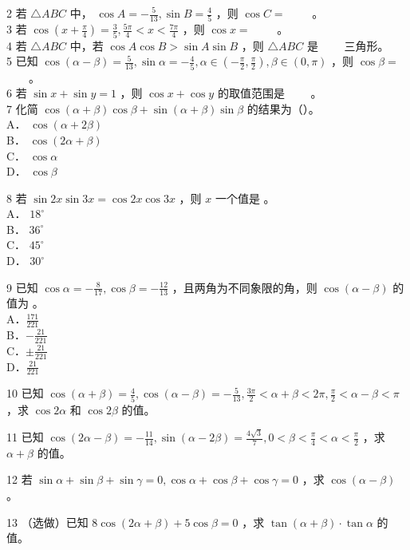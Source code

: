 \documentclass[10pt]{article}
\begin{document}
2 若 \(\triangle A B C\) 中， \(\cos A=-\frac{5}{13}, \sin B=\frac{4}{5}\) ，则 \(\cos C=\) \(\qquad\)。\\
3 若 \(\cos \left(x+\frac{\pi}{4}\right)=\frac{3}{5}, \frac{5 \pi}{4}<x<\frac{7 \pi}{4}\) ，则 \(\cos x=\) \(\qquad\)。\\
4 若 \(\triangle A B C\) 中，若 \(\cos A \cos B>\sin A \sin B\) ，则 \(\triangle A B C\) 是 \(\qquad\)三角形。\\
5 已知 \(\cos (\alpha-\beta)=\frac{5}{13}, \sin \alpha=-\frac{4}{5}, \alpha \in\left(-\frac{\pi}{2}, \frac{\pi}{2}\right), \beta \in(0, \pi)\) ，则 \(\cos \beta=\) \(\qquad\)。\\
6 若 \(\sin x+\sin y=1\) ，则 \(\cos x+\cos y\) 的取值范围是 \(\qquad\)。\\
7 化简 \(\cos (\alpha+\beta) \cos \beta+\sin (\alpha+\beta) \sin \beta\) 的结果为（）。\\
A． \(\cos (\alpha+2 \beta)\)\\
B． \(\cos (2 \alpha+\beta)\)\\
C． \(\cos \alpha\)\\
D． \(\cos \beta\)

8 若 \(\sin 2 x \sin 3 x=\cos 2 x \cos 3 x\) ，则 \(x\) 一个值是 。\\
A． \(18^{\circ}\)\\
B． \(36^{\circ}\)\\
C． \(45^{\circ}\)\\
D． \(30^{\circ}\)

9 已知 \(\cos \alpha=-\frac{8}{17}, \cos \beta=-\frac{12}{13}\) ，且两角为不同象限的角，则 \(\cos (\alpha-\beta)\) 的值为 。\\
A．\(\frac{171}{221}\)\\
B．\(-\frac{21}{221}\)\\
C．\(\pm \frac{21}{221}\)\\
D．\(\frac{21}{221}\)

10 已知 \(\cos (\alpha+\beta)=\frac{4}{5}, \cos (\alpha-\beta)=-\frac{5}{13}, \frac{3 \pi}{2}<\alpha+\beta<2 \pi, \frac{\pi}{2}<\alpha-\beta<\pi\) ，求 \(\cos 2 \alpha\) 和 \(\cos 2 \beta\) 的值。

11 已知 \(\cos (2 \alpha-\beta)=-\frac{11}{14}, \sin (\alpha-2 \beta)=\frac{4 \sqrt{3}}{7}, 0<\beta<\frac{\pi}{4}<\alpha<\frac{\pi}{2}\) ，求 \(\alpha+\beta\) 的值。

12 若 \(\sin \alpha+\sin \beta+\sin \gamma=0, \cos \alpha+\cos \beta+\cos \gamma=0\) ，求 \(\cos (\alpha-\beta)\) 。

13 （选做）已知 \(8 \cos (2 \alpha+\beta)+5 \cos \beta=0\) ，求 \(\tan (\alpha+\beta) \cdot \tan \alpha\) 的值。
\end{document}

